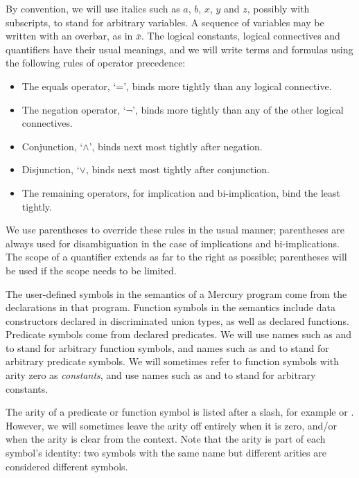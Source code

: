 By convention,
we will use italics such as $a$, $b$, $x$, $y$ and $z$,
possibly with subscripts,
to stand for arbitrary variables.
A sequence of variables may be written with an overbar,
as in $\bar{x}$.
The logical constants, logical connectives and quantifiers
have their usual meanings,
and we will write terms and formulas using
the following rules of operator precedence:
\begin{itemize}
\item
The equals operator, `=',
binds more tightly than any logical connective.
\item
The negation operator, `$\lnot$',
binds more tightly than any of the other logical connectives.
\item
Conjunction, `$\land$', binds next most tightly after negation.
\item
Disjunction, `$\lor$, binds next most tightly after conjunction.
\item
The remaining operators,
for implication and bi-implication,
bind the least tightly.
\end{itemize}
We use parentheses to override these rules in the usual manner;
parentheses are always used for disambiguation
in the case of implications and bi-implications.
The scope of a quantifier extends as far to the right as possible;
parentheses will be used if the scope needs to be limited.

The user-defined symbols in the semantics of a Mercury program
come from the declarations in that program.
Function symbols in the semantics include
data constructors declared in discriminated union types,
as well as declared functions.
Predicate symbols come from declared predicates.
We will use names such as  and 
to stand for arbitrary function symbols,
and names such as  and 
to stand for arbitrary predicate symbols.
We will sometimes refer to function symbols with arity zero
as \emph{constants\label{gi:constant}},
and use names such as  and 
to stand for arbitrary constants.

The arity of a predicate or function symbol
is listed after a slash, for example  or .
However,
we will sometimes leave the arity off entirely
when it is zero, and/or when the arity is clear from the context.
Note that the arity is part of each symbol's identity:
two symbols with the same name but different arities
are considered different symbols.

